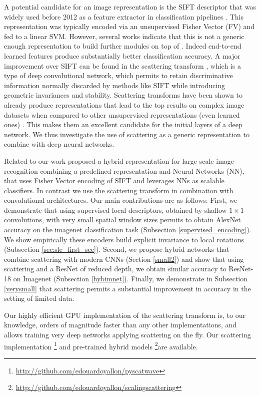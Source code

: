 \documentclass[10pt,twocolumn,letterpaper]{article}
\newcommand{\citep}{\cite}
\begin{document}
A potential candidate for an image representation is the SIFT descriptor \cite{lowe1999object} that was widely used before 2012 as a feature extractor in classification pipelines \cite{sanchez2011high,sanchez2013image}. This representation was typically encoded via an unsupervised Fisher Vector (FV) and fed to a linear SVM. However, several works indicate that this is not a generic enough representation to build further modules on top of  \cite{le2011learning,bo2013multipath}. Indeed end-to-end learned features produce substantially better classification accuracy.
A major improvement over SIFT can be found in the scattering transform \cite{mallat2012group,bruna2013invariant,sifre2013rotation}, which is a type of deep convolutional network, which permits to retain discriminative information normally discarded by methods like SIFT while introducing geometric invariances and stability. Scattering transforms have been shown to already produce representations that lead to the top results on complex image datasets when compared to other unsupervised representations (even learned ones) \citep{oyallon2015deep}. This makes them an excellent candidate for the initial layers of a deep network. We thus investigate the use of scattering as a generic representation to combine with deep neural networks.

Related to our work \cite{perronnin2015fisher} proposed a hybrid representation for large scale image recognition combining a predefined representation and Neural Networks (NN), that uses Fisher Vector encoding of SIFT and leverages NNs as scalable classifiers. In contrast we use the scattering transform in combination with convolutional architectures. Our main contributions are as follows: First, we demonstrate that using supervised local descriptors, obtained by shallow $1\times1$ convolutions, with very small spatial window sizes permits to obtain AlexNet accuracy on the imagenet classification task (Subsection \ref{supervised_encoding}). We show empirically these encoders build explicit invariance to local rotations (Subsection \ref{sec:sle_first_sec}). Second, we propose hybrid networks that combine scattering with modern CNNs  (Section \ref{small2}) and show that using scattering and a ResNet of reduced depth, we obtain similar accuracy to ResNet-18 on Imagenet (Subsection \ref{hybimnet}). Finally, we demonstrate in Subsection \ref{verysmall} that scattering permits a substantial improvement in accuracy in the setting of limited data.  

Our highly efficient GPU implementation of the scattering transform is, to our knowledge, orders of magnitude faster than any other implementations, and allows training very deep networks applying scattering on the fly. Our scattering implementation \footnote{\url{http://github.com/edouardoyallon/pyscatwave}} and pre-trained hybrid models \footnote{\url{http://github.com/edouardoyallon/scalingscattering}}are available.
\end{document}
